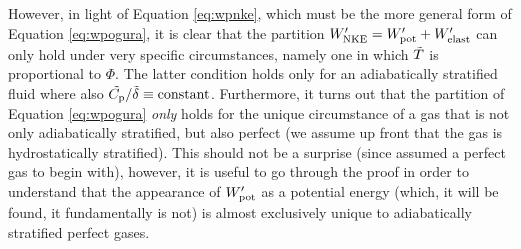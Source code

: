 \documentclass[12pt]{article}
\newcommand{\wpnke}{W^\prime_{\rm NKE}}
\newcommand{\wppot}{W^\prime_{\rm pot}}
\newcommand{\wpelast}{W^\prime_{\rm elast}}
\begin{document}
However, in light of Equation \eqref{eq:wpnke}, which must be the more general form of Equation \eqref{eq:wpogura}, it is clear that the partition $\wpnke = \wppot + \wpelast$ can only hold under very specific circumstances, namely one in which $\tilde{T}$ is proportional to $\Phi$. The latter condition holds only for an adiabatically stratified fluid where also $\tilde{C_{\rm{p}}}/\tilde{\delta}\equiv\text{constant}$. Furthermore, it turns out that the partition of Equation \eqref{eq:wpogura} \textit{only} holds for the unique circumstance of a gas that is not only adiabatically stratified, but also perfect (we assume up front that the gas is hydrostatically stratified). This should not be a surprise (since \citealt{Ogura1962} assumed a perfect gas to begin with), however, it is useful to go through the proof in order to understand that the appearance of $\wppot$ as a potential energy (which, it will be found, it fundamentally is not) is almost exclusively unique to adiabatically stratified perfect gases. 
\end{document}
